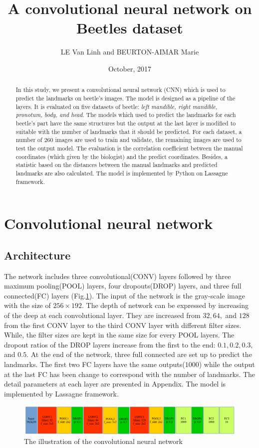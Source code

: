 \documentclass[12pt,a4paper]{article}
\begin{document}
\title{A convolutional neural network on Beetles dataset }
\author{LE Van Linh and BEURTON-AIMAR Marie}
\date{October, 2017}
\maketitle
\begin{abstract}
In this study, we present a convolutional neural network (CNN) which is used to predict the landmarks on beetle's images.  The model is designed as a pipeline of the layers. It is evaluated on five datasets of beetle: \textit{left mandible, right mandible, pronotum, body, and head}. The models which used to predict the landmarks for each beetle's part have the same structures but the output at the last layer is modified to suitable with the number of landmarks that it should be predicted. For each dataset, a number of $260$ images are used to train and validate, the remaining images are used to test the output model. The evaluation is the correlation coefficient between the manual coordinates (which given by the biologist) and the predict coordinates. Besides, a statistic based on the distances between the manual landmarks and predicted landmarks are also calculated. The model is implemented by Python on Lassagne framework\cite{lasagne}.
\end{abstract}

\section{Convolutional neural network}
\subsection{Architecture}
The network includes three convolutional(CONV) layers followed by three maximum pooling(POOL) layers, four dropouts(DROP) layers, and three full connected(FC) layers (Fig.\ref{pmodel}). The input of the network is the gray-scale image with the size of $256 \times 192$. The depth of network can be expressed by increasing of the deep at each convolutional layer. They are increased from $32, 64,$ and $128$ from the first CONV layer to the third CONV layer with different filter sizes. While, the filter sizes are kept in the same size for every POOL layers. The dropout ratios of the DROP layers increase from the first to the end: $0.1, 0.2, 0.3, $ and $0.5$. At the end of the network, three full connected are set up to predict the landmarks. The first two FC layers have the same outputs($1000$) while the output at the last FC has been change to correspond with the number of landmarks. The detail parameters at each layer are presented in Appendix. The model is implemented by Lassagne framework\cite{lasagne}.
\begin{figure}[h!]
	\centering
	\includegraphics[scale=0.45]{images/model3_dropout}
	\caption{The illustration of the convolutional neural network}
	\label{pmodel}
\end{figure}
\end{document}
